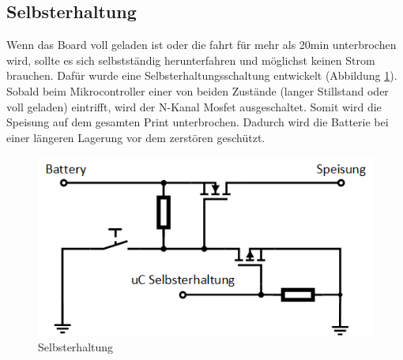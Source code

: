 \subsection*{Selbsterhaltung}
Wenn das Board voll geladen ist oder die fahrt für mehr als 20min unterbrochen wird, sollte es sich selbstständig herunterfahren und möglichst keinen Strom brauchen. Dafür wurde eine Selbsterhaltungsschaltung entwickelt (Abbildung \ref{fig:Selbsterhaltung}). Sobald beim Mikrocontroller einer von beiden Zustände (langer Stillstand oder voll geladen) eintrifft, wird der N-Kanal Mosfet ausgeschaltet. Somit wird die Speisung auf dem gesamten Print unterbrochen. Dadurch wird die Batterie bei einer längeren Lagerung vor dem zerstören geschützt.

\begin{figure} [H]
	\centering
	\includegraphics[width=0.6\linewidth]{images/Selbsterhaltung}
	\caption{Selbsterhaltung}
	\label{fig:Selbsterhaltung}
\end{figure}




